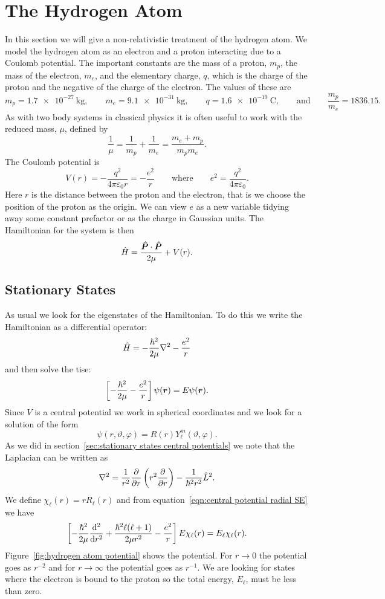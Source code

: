 \documentclass[a4paper]{article}
\newcommand{\vecoperator}[1]{\vv{\operator{#1}}}
\theoremstyle{definition}
\begin{document}
    \section{The Hydrogen Atom}
    In this section we will give a non-relativistic treatment of the hydrogen atom.
    We model the hydrogen atom as an electron and a proton interacting due to a Coulomb potential.
    The important constants are the mass of a proton, \(m_p\), the mass of the electron, \(m_e\), and the elementary charge, \(q\), which is the charge of the proton and the negative of the charge of the electron.
    The values of these are
    \[m_p = \SI{1.7e-27}{\kilogram}, \qquad m_e = \SI{9.1e-31}{\kilogram}, \qquad q = \SI{1.6e-19}{\coulomb}, \qquad\text{and}\qquad \frac{m_p}{m_e} = 1836.15.\]
    As with two body systems in classical physics it is often useful to work with the reduced mass, \(\mu\), defined by
    \[\frac{1}{\mu} = \frac{1}{m_p} + \frac{1}{m_e} = \frac{m_e + m_p}{m_pm_e}.\]
    The Coulomb potential is
    \[V(r) = -\frac{q^2}{4\pi\varepsilon_0r} = -\frac{e^2}{r}\qquad\text{where}\qquad e^2 = \frac{q^2}{4\pi\varepsilon_0}.\]
    Here \(r\) is the distance between the proton and the electron, that is we choose the position of the proton as the origin.
    We can view \(e\) as a new variable tidying away some constant prefactor or as the charge in Gaussian units.
    The Hamiltonian for the system is then
    \[\operator{H} = \frac{\vecoperator{P}\cdot\vecoperator{P}}{2\mu} + V(r).\]
    
    \subsection{Stationary States}\label{sec:stationary states hydrogen atom}
    As usual we look for the eigenstates of the Hamiltonian.
    To do this we write the Hamiltonian as a differential operator:
    \[\hat{H} = -\frac{\hbar^2}{2\mu}\nabla^2 - \frac{e^2}{r}\]
    and then solve the \gls{tise}:
    \[\left[-\frac{\hbar^2}{2\mu} - \frac{e^2}{r}\right]\psi(\bm{r}) = E\psi(\bm{r}).\]
    Since \(V\) is a central potential we work in spherical coordinates and we look for a solution of the form
    \[\psi(r, \vartheta, \varphi) = R(r)Y_\ell^m(\vartheta, \varphi).\]
    As we did in section~\ref{sec:stationary states central potentials} we note that the Laplacian can be written as
    \[\nabla^2 = \frac{1}{r^2}\pdv{r}\left(r^2\pdv{r}\right) - \frac{1}{\hbar^2r^2}\hat{L}^2.\]
    We define \(\chi_\ell(r) = rR_\ell(r)\) and from equation~\ref{eqn:central potential radial SE} we have
    \[\left[-\frac{\hbar^2}{2\mu}\dv[2]{r} + \frac{\hbar^2\ell(\ell + 1)}{2\mu r^2} - \frac{e^2}{r}\right]E\chi_\ell(r) = E_\ell\chi_\ell(r).\]
    Figure~\ref{fig:hydrogen atom potential} shows the potential.
    For \(r \to 0\) the potential goes as \(r^{-2}\) and for \(r\to \infty\) the potential goes as \(r^{-1}\).
    We are looking for states where the electron is bound to the proton so the total energy, \(E_\ell\), must be less than zero.
    
\end{document}
